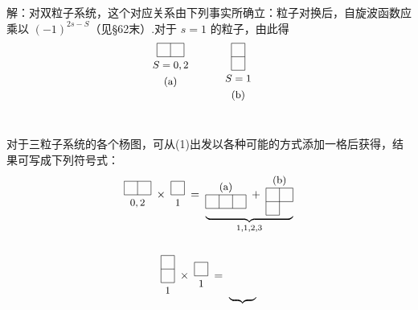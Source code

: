 \begin{xiti}
解：对双粒子系统，这个对应关系由下列事实所确立：粒子对换后，自旋波函数应乘以 $(-1)^{2s-S}$（见§62末）.对于 $s=1$ 的粒子，由此得
\setcounter{equation}{0}\renewcommand{\theequation}{\arabic{equation}}%
\begin{equation}
  \setlength{\unitlength}{1pt}%
  \begin{picture}(140,72)
    \yh{24}{60}{24}\yh{24}{72}{24}\yv{24}{60}{12}\yv{36}{60}{12}\yv{48}{60}{12}%
    \ytl{36}{56}{$S=0,2$}\ytl{36}{42}{(a)}%
    \yh{90}{48}{12}\yh{90}{60}{12}\yh{90}{72}{12}\yv{90}{48}{24}\yv{102}{48}{24}%
    \ytl{96}{44}{$S=1$}\ytl{96}{30}{(b)}%
  \end{picture}
\end{equation}
对于三粒子系统的各个杨图，可从(1)出发以各种可能的方式添加一格后获得，结果可写成下列符号式：
\begin{equation*}
\begin{gathered}
  \vcenter{\hbox{%
  \begin{picture}(24,24)
    \yh{0}{12}{24}\yh{0}{24}{24}\yv{0}{12}{12}\yv{12}{12}{12}\yv{24}{12}{12}%
    \ytl{12}{8}{$0,2$}%
  \end{picture}}}%
  \;\times\;
  \vcenter{\hbox{%
  \begin{picture}(12,24)
    \yh{0}{12}{12}\yh{0}{24}{12}\yv{0}{12}{12}\yv{12}{12}{12}%
    \ytl{6}{8}{$1$}%
  \end{picture}}}%
  \;=\;
  \underbrace{%
  \vcenter{\hbox{%
  \begin{picture}(36,24)
    \yh{0}{0}{36}\yh{0}{12}{36}\yv{0}{0}{12}\yv{12}{0}{12}\yv{24}{0}{12}\yv{36}{0}{12}%
    \ybl{18}{14}{(a)}%
  \end{picture}}}%
  \;+\;
  \vcenter{\hbox{%
  \begin{picture}(24,36)
    \yh{0}{0}{12}\yh{0}{12}{24}\yh{0}{24}{24}\yv{0}{0}{24}\yv{12}{0}{24}\yv{24}{12}{12}%
    \ybl{12}{26}{(b)}%
  \end{picture}}}}_{1,1,2,3}\\[1.6em]
  \vcenter{\hbox{%
  \begin{picture}(12,36)
    \yh{0}{12}{12}\yh{0}{24}{12}\yh{0}{36}{12}\yv{0}{12}{24}\yv{12}{12}{24}%
    \ytl{6}{8}{$1$}%
  \end{picture}}}%
  \;\times\;
  \vcenter{\hbox{%
  \begin{picture}(12,24)
    \yh{0}{12}{12}\yh{0}{24}{12}\yv{0}{12}{12}\yv{12}{12}{12}%
    \ytl{6}{8}{$1$}%
  \end{picture}}}%
  \;=\;
  \underbrace{%
  \vcenter{\hbox{%
  \begin{picture}(24,36)

\end{picture}}}}
\end{gathered}
\end{equation*}
\end{xiti}
